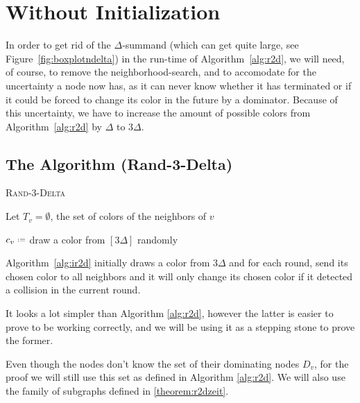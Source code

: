 \chapter{Without Initialization}

In order to get rid of the $\Delta$-summand (which can get quite large, see Figure~\ref{fig:boxplotndelta}) in the run-time of Algorithm~\ref{alg:r2d}, we will need, of course, to remove the neighborhood-search, and to accomodate for the uncertainty a node now has, as it can never know whether it has terminated or if it could be forced to change its color in the future by a dominator. Because of this uncertainty, we have to increase the amount of possible colors from Algorithm~\ref{alg:r2d} by $\Delta$ to $3\Delta$.

\section{The Algorithm (Rand-3-Delta)}

\begin{algorithm}[ht]
\DontPrintSemicolon 
\caption{\textsc{Rand-3-Delta}}\label{alg:ir2d}

Let $T_v = \emptyset$, the set of colors of the neighbors of $v$\;

$c_v \defines$ draw a color from $[3\Delta]$ randomly\;



\end{algorithm}

Algorithm~\ref{alg:ir2d} initially draws a color from $3\Delta$ and for each round, send its chosen color to all neighbors and it will only change its chosen color if it detected a collision in the current round.

It looks a lot simpler than Algorithm \ref{alg:r2d}, however the latter is easier to prove to be working correctly, and we will be using it as a stepping stone to prove the former.

Even though the nodes don't know the set of their dominating nodes $D_v$, for the proof we will still use this set as defined in Algorithm \ref{alg:r2d}. We will also use the family of subgraphs defined in \ref{theorem:r2dzeit}.

